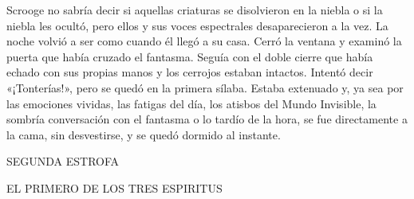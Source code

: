 \documentclass{novela}
\begin{document}
 Scrooge no sabría decir si aquellas criaturas se disolvieron en la niebla o si la niebla les ocultó, pero ellos y sus voces espectrales desaparecieron a la vez. La noche volvió a ser como cuando él llegó a su casa.
 Cerró la ventana y examinó la puerta que había cruzado el fantasma. Seguía con el doble cierre que había echado con sus propias manos y los cerrojos estaban intactos. Intentó decir «¡Tonterías!», pero se quedó en la primera sílaba. Estaba extenuado y, ya sea por las emociones vividas, las fatigas del día, los atisbos del Mundo Invisible, la sombría conversación con el fantasma o lo tardío de la hora, se fue directamente a la cama, sin desvestirse, y se quedó dormido al instante.




 SEGUNDA ESTROFA


 EL PRIMERO DE LOS TRES ESPIRITUS
\end{document}
